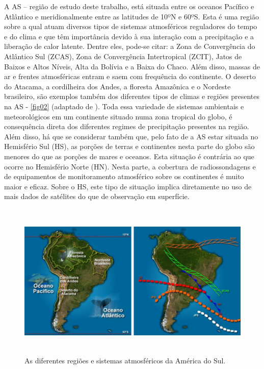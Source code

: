 A AS – região de estudo deste trabalho, está situada entre os oceanos Pacífico e Atlântico e meridionalmente entre as latitudes de 10ºN e 60ºS. Esta é uma região sobre a qual atuam diversos tipos de sistemas atmosféricos reguladores do tempo e do clima e que têm importância devido à sua interação com a precipitação e a liberação de calor latente. Dentre eles, pode-se citar: a Zona de Convergência do Atlântico Sul (ZCAS), Zona de Convergência Intertropical (ZCIT), Jatos de Baixos e Altos Níveis, Alta da Bolívia e a Baixa do Chaco. Além disso, massas de ar e frentes atmosféricas entram e saem com frequência do continente. O deserto do Atacama, a cordilheira dos Andes, a floresta Amazônica e o Nordeste brasileiro, são exemplos também dos diferentes tipos de climas e regiões presentes na AS - \autoref{fig02} (adaptado de ). Toda essa variedade de sistemas ambientais e meteorológicos em um continente situado numa zona tropical do globo, é consequência direta dos diferentes regimes de precipitação presentes na região. Além disso, há que se considerar também que, pelo fato de a AS estar situada no Hemisfério Sul (HS), as porções de terras e continentes nesta parte do globo são menores do que as porções de mares e oceanos. Esta situação é contrária ao que ocorre no Hemisfério Norte (HN). Nesta parte, a cobertura de radiossondagens e de equipamentos de monitoramento atmosférico sobre os continentes é muito maior e eficaz. Sobre o HS, este tipo de situação implica diretamente no uso de mais dados de satélites do que de observação em superfície.

\begin{figure}
\centering
\includegraphics[height=7.5cm]{./figs/fig02.png}
\caption{As diferentes regiões e sistemas atmosféricos da América do Sul.}
\label{fig02}
\end{figure}

